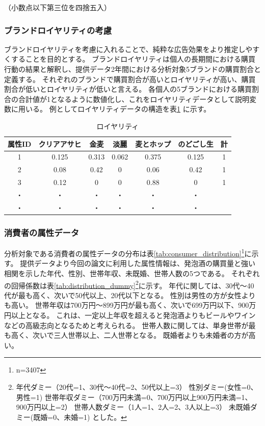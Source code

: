 \documentclass[11pt]{jsarticle}
\begin{document}
（小数点以下第三位を四捨五入）

\subsubsection{ブランドロイヤリティの考慮}
\label{subsec:royality}
ブランドロイヤリティを考慮に入れることで、純粋な広告効果をより推定しやすくすることを目的とする。
ブランドロイヤリティは個人の長期間における購買行動の結果と解釈し、提供データ2年間における分析対象5ブランドの購買割合と定義する。
それぞれのブランドで購買割合が高いとロイヤリティが高い、購買割合が低いとロイヤリティが低いと言える。
各個人の5ブランドにおける購買割合の合計値が1となるように数値化し、これをロイヤリティデータとして説明変数に用いる。
例としてロイヤリティデータの構造を表\ref{tab:royality_ex} に示す。

\begin{table}[htbp]
  \centering
  \caption{ロイヤリティ}
\begin{center}
 \begin{tabular}{c|ccccc|c} \hline
   属性ID & クリアアサヒ & 金麦 & 淡麗 & 麦とホップ & のどごし生 & 計 \\ \hline
   1 & 0.125 & 0.313 & 0.062 & 0.375 & 0.125 & 1 \\
   2 & 0.08 & 0.42 & 0 & 0.06 & 0.42 & 1 \\
   3 & 0.12 & 0 & 0 & 0.88 & 0 & 1 \\
   ・ & ・ & ・ & ・ & ・ & ・ & \\
   ・ & ・ & ・ & ・ & ・ & ・ & \\  
  \end{tabular}
  \label{tab:royality_ex}
 \end{center}
\end{table}

\subsubsection{消費者の属性データ}
\label{subsec:consumer_distribution}
分析対象である消費者の属性データの分布は表\ref{tab:consumer_distribution}\footnote{n=3407}に示す。
提供データより今回の論文に利用した属性情報は、発泡酒の購買量と強い相関を示した年代、性別、世帯年収、未既婚、世帯人数の5つである。
それぞれの回帰係数は表\ref{tab:distribution_dummy}\footnote{年代ダミー（20代=1、30代〜40代=2、50代以上=3）
性別ダミー(女性=0、男性=1)
世帯年収ダミー（700万円未満=0、700万円以上900万円未満=1、900万円以上=2）
世帯人数ダミー（1人=1、2人=2、3人以上=3）
未既婚ダミー(既婚=0、未婚=1)
とした。}に示す。
年代に関しては、30代〜40代が最も高く、次いで50代以上、20代以下となる。
性別は男性の方が女性よりも高い。
世帯年収は700万円〜899万円が最も高く、次いで699万円以下、900万円以上となる。
これは、一定以上年収を超えると発泡酒よりもビールやワインなどの高級志向となるためと考えられる。
世帯人数に関しては、単身世帯が最も高く、次いで三人世帯以上、二人世帯となる。
既婚者よりも未婚者の方が高い。
\end{document}
